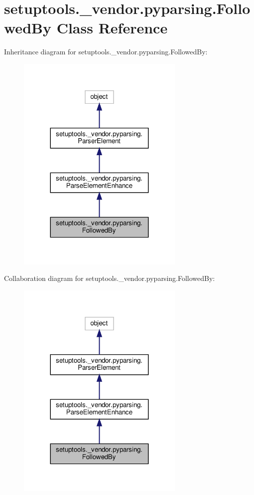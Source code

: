 \hypertarget{classsetuptools_1_1__vendor_1_1pyparsing_1_1FollowedBy}{}\section{setuptools.\+\_\+vendor.\+pyparsing.\+Followed\+By Class Reference}
\label{classsetuptools_1_1__vendor_1_1pyparsing_1_1FollowedBy}


Inheritance diagram for setuptools.\+\_\+vendor.\+pyparsing.\+Followed\+By\+:
\nopagebreak
\begin{figure}[H]
\begin{center}
\leavevmode
\includegraphics[width=227pt]{classsetuptools_1_1__vendor_1_1pyparsing_1_1FollowedBy__inherit__graph}
\end{center}
\end{figure}


Collaboration diagram for setuptools.\+\_\+vendor.\+pyparsing.\+Followed\+By\+:
\nopagebreak
\begin{figure}[H]
\begin{center}
\leavevmode
\includegraphics[width=227pt]{classsetuptools_1_1__vendor_1_1pyparsing_1_1FollowedBy__coll__graph}
\end{center}
\end{figure}
